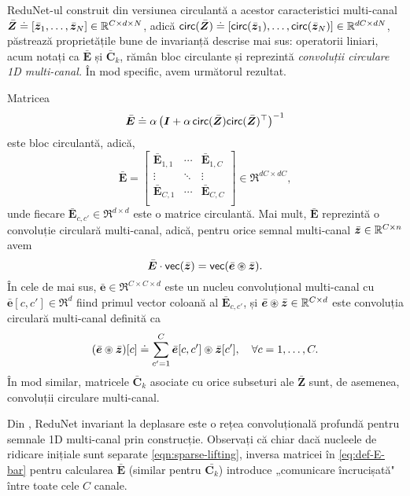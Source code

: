 \documentclass[../../book-main_ro.tex]{subfiles}
\begin{document}
ReduNet-ul construit din versiunea circulantă a acestor caracteristici multi-canal $\bar{\bm{Z}} \doteq [\bar {\bm{z}}_1, \ldots, \bar {\bm{z}}_N] \in \mathbb{R}^{C \times d \times N}$, adică $\mathsf{circ}(\bar{\bm{Z}}) \doteq [ \mathsf{circ}(\bar{\bm{z}}_1), \dots, \mathsf{circ}(\bar{\bm{z}}_N)] \in \mathbb{R}^{dC \times dN}$, păstrează proprietățile bune de invarianță descrise mai sus: operatorii liniari, acum notați ca $\bar{\bm E}$ și $\bar{\bm C}_k$, rămân bloc circulante și reprezintă {\em convoluții circulare 1D multi-canal.}
În mod specific, avem următorul rezultat.
\begin{proposition}
Matricea 
\begin{equation}
\label{eq:def-E-bar}
\bar{\bm E} \doteq \alpha\left(\bm I + \alpha\, \mathsf{circ}(\bar{\bm{Z}}) \mathsf{circ}(\bar{\bm{Z}})^\top \right) ^{-1}  
\end{equation}
este bloc circulantă, adică,
\begin{equation*}
    \bar{\bm E} = 
    \left[\begin{matrix}
        \bar{\bm E}_{1, 1} & \cdots & \bar{\bm E}_{1, C}\\
        \vdots & \ddots & \vdots \\
        \bar{\bm E}_{C, 1} & \cdots & \bar{\bm E}_{C, C}\\
    \end{matrix}\right] \in \Re^{dC \times dC},
\end{equation*}
unde fiecare $\bar{\bm E}_{c, c'}\in \Re^{d \times d}$ este o matrice circulantă. Mai mult, $\bar{\bm E}$ reprezintă o convoluție circulară multi-canal, adică, pentru orice semnal multi-canal $\bar{\bm{z}} \in \mathbb{R}^{C \times n}$ avem 
$$\bar{\bm E} \cdot \textsf{vec}(\bar{\bm{z}}) = \textsf{vec}( \bar{\bm e} \circledast \bar{\bm{z}}).$$ 
În cele de mai sus, $\bar{\bm e} \in \Re^{C \times C \times d}$ este un nucleu convoluțional multi-canal cu $\bar{\bm e}[c, c'] \in \Re^{d}$ fiind primul vector coloană al $\bar{\bm E}_{c, c'}$, și $\bar{\bm e} \circledast \bar{\bm{z}} \in \mathbb{R}^{C \times d}$ este convoluția circulară multi-canal definită ca
\begin{equation*}
    (\bar{\bm e} \circledast \bar{\bm{z}})[c] \doteq \sum_{c'=1}^C \bar{\bm e}[c, c'] \circledast \bar{\bm{z}}[c'], \quad \forall c = 1, \ldots, C.
\end{equation*}
În mod similar, matricele $\bar{\bm C}_k$ asociate cu orice subseturi ale $\bar{\bm Z}$ sunt, de asemenea, convoluții circulare multi-canal. 
\label{prop:multichannel-circular-conv-1}
\end{proposition}
Din , ReduNet invariant la deplasare este o rețea convoluțională profundă pentru semnale 1D multi-canal prin construcție. Observați că chiar dacă nucleele de ridicare inițiale sunt separate \eqref{eqn:sparse-lifting}, inversa matricei în \eqref{eq:def-E-bar} pentru calcularea $\bar{\bm E}$ (similar pentru $\bar{\bm C_k}$) introduce „comunicare încrucișată" între toate cele $C$ canale.
\end{document}
